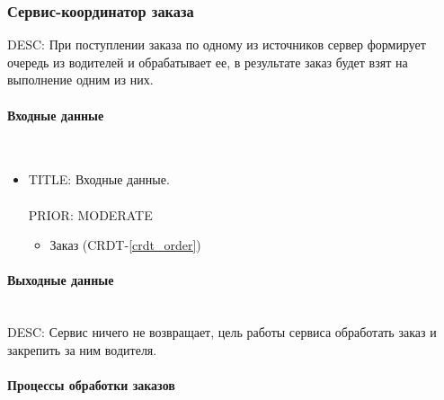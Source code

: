 \subsubsection{Сервис-координатор заказа} \label{selection_drivers_for_the_order}

    DESC:  При поступлении заказа по одному из источников сервер формирует очередь из водителей и обрабатывает ее, в результате заказ будет взят на выполнение одним из них. 

    \paragraph{Входные данные} \mbox{} \\ \label{}

	  \begin{itemize}

	    \item{

	      TITLE: Входные данные.\\
	      \\
	      PRIOR: MODERATE\\

	    }

	    \begin{itemize}
	      \item Заказ (CRDT-\ref{crdt_order})
	    \end{itemize}

	  \end{itemize}

	\paragraph{Выходные данные} \mbox{} \\

		DESC: Сервис ничего не возвращает, цель работы сервиса обработать заказ и закрепить за ним водителя.


	\paragraph{Процессы обработки заказов} \mbox{} \\
     
    
    

    

    